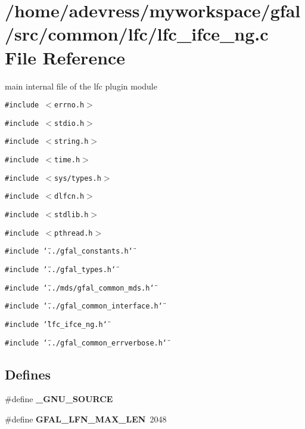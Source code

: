 \section{/home/adevress/myworkspace/gfal/src/common/lfc/lfc\_\-ifce\_\-ng.c File Reference}
\label{lfc__ifce__ng_8c}
main internal file of the lfc plugin module 

{\tt \#include $<$errno.h$>$}\par
{\tt \#include $<$stdio.h$>$}\par
{\tt \#include $<$string.h$>$}\par
{\tt \#include $<$time.h$>$}\par
{\tt \#include $<$sys/types.h$>$}\par
{\tt \#include $<$dlfcn.h$>$}\par
{\tt \#include $<$stdlib.h$>$}\par
{\tt \#include $<$pthread.h$>$}\par
{\tt \#include \char`\"{}../gfal\_\-constants.h\char`\"{}}\par
{\tt \#include \char`\"{}../gfal\_\-types.h\char`\"{}}\par
{\tt \#include \char`\"{}../mds/gfal\_\-common\_\-mds.h\char`\"{}}\par
{\tt \#include \char`\"{}../gfal\_\-common\_\-interface.h\char`\"{}}\par
{\tt \#include \char`\"{}lfc\_\-ifce\_\-ng.h\char`\"{}}\par
{\tt \#include \char`\"{}../gfal\_\-common\_\-errverbose.h\char`\"{}}\par
\subsection*{Defines}
\begin{CompactItemize}
\item 
\#define \textbf{\_\-GNU\_\-SOURCE}\label{lfc__ifce__ng_8c_53abf256730d533302d1910e5fb61efe}

\item 
\#define \textbf{GFAL\_\-LFN\_\-MAX\_\-LEN}~2048\label{lfc__ifce__ng_8c_74cbac9029a516b4ae28199debf71835}

\end{CompactItemize}
